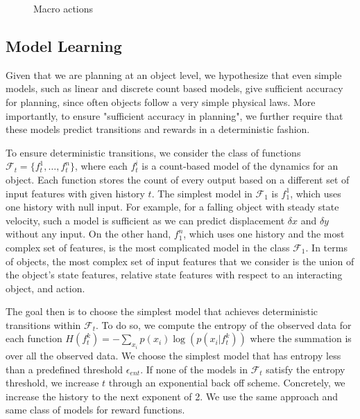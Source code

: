 \begin{figure}[tb]
    \centering
    \caption{Macro actions}%
    \label{fig:meta_action}%
\end{figure}

\subsection{Model Learning}\label{sec:model_learning}

Given that we are planning at an object level, we hypothesize that even simple models, such as linear and discrete count based models, give sufficient accuracy for planning, since often objects follow a very simple physical laws. More importantly, to ensure "sufficient accuracy in planning", we further require that these models predict transitions and rewards in a deterministic fashion.

To ensure deterministic transitions, we consider the class of functions $\mathcal{F}_t = \{f_{t}^{1},\dots,f_{t}^{n}\}$, where each $f_{t}^{i}$ is a count-based model of the dynamics for an object. Each function stores the count of every output based on a different set of input features with given history $t$. The simplest model in $\mathcal{F}_1$ is $f_{1}^{1}$, which uses one history with null input. For example, for a falling object with steady state velocity, such a model is sufficient as we can predict displacement $\delta x$ and $\delta y$ without any input. On the other hand, $f_{1}^{n}$, which uses one history and the most complex set of features, is the most complicated model in the class $\mathcal{F}_1$. In terms of objects, the most complex set of input features that we consider is the union of the object's state features, relative state features with respect to an interacting object, and action. 

The goal then is to choose the simplest model that achieves deterministic transitions within $\mathcal{F}_t$. To do so, we compute the entropy of the observed data for each function $H(f_{t}^{k}) = -\sum_{x_i} p(x_i) \log(p(x_i|f_{t}^{k}))$ where the summation is over all the observed data. We choose the simplest model that has entropy less than a predefined threshold $\epsilon_{ent}$. If none of the models in $\mathcal{F}_t$ satisfy the entropy threshold, we increase $t$ through an exponential back off scheme. Concretely, we increase the history to the next exponent of 2. We use the same approach and same class of models for reward functions.

